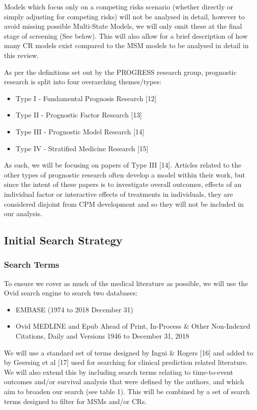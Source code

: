 \documentclass[
]{article}
\providecommand{\tightlist}{%
  \setlength{\itemsep}{0pt}\setlength{\parskip}{0pt}}
\begin{document}
Models which focus only on a competing risks scenario (whether directly or simply adjusting for competing risks) will not be analysed in detail, however to avoid missing possible Multi-State Models, we will only omit these at the final stage of screening (See below). This will also allow for a brief description of how many CR models exist compared to the MSM models to be analysed in detail in this review.

As per the definitions set out by the PROGRESS research group, prognostic research is split into four overarching themes/types:
\begin{itemize}
\tightlist
\item
  Type I - Fundamental Prognosis Research {[}12{]}
\item
  Type II - Prognostic Factor Research {[}13{]}
\item
  Type III - Prognostic Model Research {[}14{]}
\item
  Type IV - Stratified Medicine Research {[}15{]}
\end{itemize}
As such, we will be focusing on papers of Type III {[}14{]}. Articles related to the other types of prognostic research often develop a model within their work, but since the intent of these papers is to investigate overall outcomes, effects of an individual factor or interactive effects of treatments in individuals, they are considered disjoint from CPM development and so they will not be included in our analysis.

\hypertarget{initial-search-strategy}{%
\subsection{Initial Search Strategy}\label{initial-search-strategy}}

\hypertarget{search-terms}{%
\subsubsection{Search Terms}\label{search-terms}}

To ensure we cover as much of the medical literature as possible, we will use the Ovid search engine to search two databases:
\begin{itemize}
\tightlist
\item
  EMBASE (1974 to 2018 December 31)
\item
  Ovid MEDLINE and Epub Ahead of Print, In-Process \& Other Non-Indexed Citations, Daily and Versions 1946 to December 31, 2018
\end{itemize}
We will use a standard set of terms designed by Ingui \& Rogers {[}16{]} and added to by Geersing et al {[}17{]} used for searching for clinical prediction related literature. We will also extend this by including search terms relating to time-to-event outcomes and/or survival analysis that were defined by the authors, and which aim to broaden our search (see table 1). This will be combined by a set of search terms designed to filter for MSMs and/or CRs.
\end{document}

